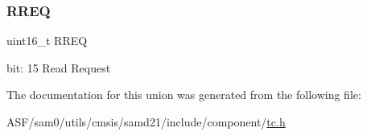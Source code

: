 \subsubsection{\texorpdfstring{RREQ}{RREQ}}
{\footnotesize\ttfamily uint16\+\_\+t R\+R\+EQ}

bit\+: 15 Read Request 

The documentation for this union was generated from the following file\+:\begin{DoxyCompactItemize}
\item 
A\+S\+F/sam0/utils/cmsis/samd21/include/component/\mbox{\hyperlink{utils_2cmsis_2samd21_2include_2component_2tc_8h}{tc.\+h}}\end{DoxyCompactItemize}
